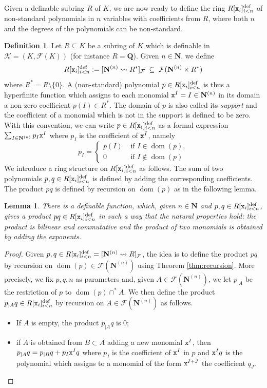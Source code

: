 \documentclass{amsart}
\newcommand{\ca}{\mathcal}
\newcommand{\dom}{\operatorname{dom}}
\newcommand{\nin}{\not \in}
\theoremstyle{plain}
\newtheorem{lem}[thm]{Lemma}
\theoremstyle{definition}
\newtheorem{defn}[thm]{Definition}
\newcommand{\F}{\mathcal{F}}
\newcommand{\hn}{\mathbf N}
\newcommand{\hQ}{\mathbf Q}
\newcommand{\pto}{\leadsto} %
\newcommand{\pfun}[2]{[#1 \pto #2]_{\F}}
\newcommand{\polyn}[2]{{#1}[{\tt x}_i]_{i<#2}^\text{def}}
\begin{document}
Given a definable subring $R$ of $K$, we are now ready to define the ring $\polyn R n$ of non-standard polynomials in $n$ variables with coefficients from $R$, where both $n$ and the degrees of the polynomials can be non-standard. 
 
\begin{defn}\label{defn:polynomials}
Let $R\subseteq K$ be a subring of $K$ which is definable in $\ca K = (K, \F(K))$ (for instance $R = \hQ$). Given $n\in \hn$, we define 
$$\polyn R n := \pfun {\hn^{(n)}} {R^*} \; \subseteq \; \F(\hn^{(n)} \times R^*)$$ 
where $R^* = R\setminus \{0\}$.  A (non-standard) polynomial $p\in \polyn R n$ is thus a hyperfinite function which assigns to each monomial ${\tt x}^I = I \in \hn^{(n)}$ in its domain a non-zero coefficient $p(I)\in R^*$. The domain of $p$ is also called its {\em support} and the  coefficient of a monomial which is not in the support is defined to be zero. 
With this convention, we can write $p \in \polyn R n$ as a formal expression $\sum_{I\in \hn^{(n)}} p_I {\tt x}^I$ where $p_I$ is the coefficient of ${\tt x}^I$, namely 
%
$$p_I = \begin{cases} p(I) & \text{ if } I \in \dom (p), \\ 0 & \text{ if } I \nin \dom (p) \end{cases}$$
% 
We introduce a ring structure on $\polyn R n$ as follows. The sum of two polynomials $p,q \in \polyn R n$ is defined by adding the corresponding coefficients. The product $pq$ is defined by recursion on $\dom(p)$ as in the following lemma. 
\end{defn}

\begin{lem}\label{lem:product}
 There is a definable function, which, given $n\in \hn$ and $p,q\in \polyn R n$, gives a {\em product} $pq \in \polyn R n$ in such a way that the natural properties hold: the product is bilinear and commutative and the product of two monomials is obtained by adding the exponents.  
\end{lem}
\begin{proof} Given $p,q\in \polyn R n = \pfun {\hn^{(n)}} R$, the idea is to define the product $pq$ by recursion on $\dom(p)\in \F(\hn^{(n)})$ using Theorem \ref{thm:recursion}. 
More precisely, we fix $p,q,n$ as parameters and, given $A\in \F(\hn^{(n)})$, we let $p_{|A}$ be the restriction of $p$ to $\dom(p) \cap^* A$. We then define the product $p_{|A} q \in \polyn R n$ by recursion on $A\in \F(\hn^{(n)})$ as follows. 
\begin{itemize}
\item If $A$ is empty, the product $p_{|A} q$ is $0$; 
\item if $A$ is obtained from $B\subset A$ adding a new monomial ${\tt x}^I$, then $p_{|A} q = p_{|B}q + p_I {\tt x}^I q$ where $p_I$ is the coefficient of ${\tt x}^I$ in $p$ and ${\tt x}^I q$ is the polynomial which assigns to a monomial of the form ${\tt x}^{I +J}$ the coefficient $q_J$. 
\end{itemize}
\end{proof} 
\end{document}
